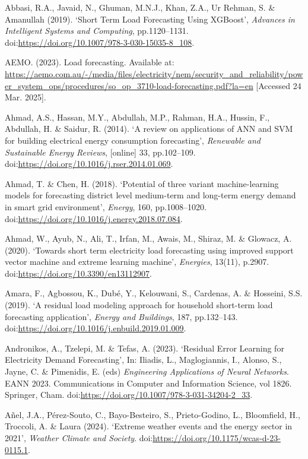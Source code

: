 \documentclass[mstat,12pt]{unswthesis}
\begin{document}
\begin{hangparas}{.25in}{1}
Abbasi, R.A., Javaid, N., Ghuman, M.N.J., Khan, Z.A., Ur Rehman, S. \& Amanullah (2019). ‘Short Term Load Forecasting Using XGBoost’, \textit{Advances in Intelligent Systems and Computing}, pp.1120–1131. doi:\url{https://doi.org/10.1007/978-3-030-15035-8_108}.

AEMO. (2023). Load forecasting. Available at: \url{https://aemo.com.au/-/media/files/electricity/nem/security_and_reliability/power_system_ops/procedures/so_op_3710-load-forecasting.pdf?la=en} [Accessed 24 Mar. 2025].

Ahmad, A.S., Hassan, M.Y., Abdullah, M.P., Rahman, H.A., Hussin, F., Abdullah, H. \& Saidur, R. (2014). ‘A review on applications of ANN and SVM for building electrical energy consumption forecasting’, \textit{Renewable and Sustainable Energy Reviews}, [online] 33, pp.102–109. doi:\url{https://doi.org/10.1016/j.rser.2014.01.069}.

Ahmad, T. \& Chen, H. (2018). ‘Potential of three variant machine-learning models for forecasting district level medium-term and long-term energy demand in smart grid environment’, \textit{Energy}, 160, pp.1008–1020. doi:\url{https://doi.org/10.1016/j.energy.2018.07.084}.

Ahmad, W., Ayub, N., Ali, T., Irfan, M., Awais, M., Shiraz, M. \& Glowacz, A. (2020). ‘Towards short term electricity load forecasting using improved support vector machine and extreme learning machine’, \textit{Energies}, 13(11), p.2907. doi:\url{https://doi.org/10.3390/en13112907}.

Amara, F., Agbossou, K., Dubé, Y., Kelouwani, S., Cardenas, A. \& Hosseini, S.S. (2019). ‘A residual load modeling approach for household short-term load forecasting application’, \textit{Energy and Buildings}, 187, pp.132–143. doi:\url{https://doi.org/10.1016/j.enbuild.2019.01.009}.

Andronikos, A., Tzelepi, M. \& Tefas, A. (2023). ‘Residual Error Learning for Electricity Demand Forecasting’, In: Iliadis, L., Maglogiannis, I., Alonso, S., Jayne, C. \& Pimenidis, E. (eds) \textit{Engineering Applications of Neural Networks}. EANN 2023. Communications in Computer and Information Science, vol 1826. Springer, Cham. doi:\url{https://doi.org/10.1007/978-3-031-34204-2_33}.

Añel, J.A., Pérez-Souto, C., Bayo-Besteiro, S., Prieto-Godino, L., Bloomfield, H., Troccoli, A. \& Laura (2024). ‘Extreme weather events and the energy sector in 2021’, \textit{Weather Climate and Society}. doi:\url{https://doi.org/10.1175/wcas-d-23-0115.1}.


\end{hangparas}
\end{document}

